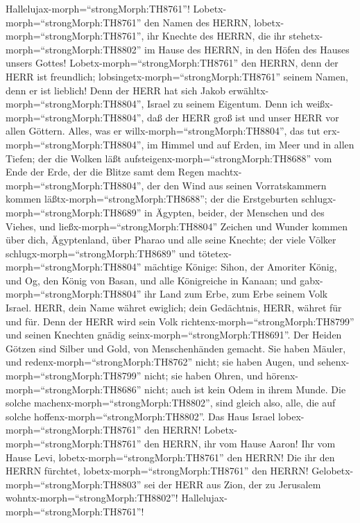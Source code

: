  Hallelujax-morph=``strongMorph:TH8761''!
Lobetx-morph=``strongMorph:TH8761'' den Namen des HERRN,
lobetx-morph=``strongMorph:TH8761'', ihr Knechte des HERRN, 
die ihr stehetx-morph=``strongMorph:TH8802'' im Hause des HERRN, in den
Höfen des Hauses unsers Gottes! 
Lobetx-morph=``strongMorph:TH8761'' den HERRN, denn der HERR ist
freundlich; lobsingetx-morph=``strongMorph:TH8761'' seinem Namen, denn
er ist lieblich!  Denn der HERR hat sich Jakob
erwähltx-morph=``strongMorph:TH8804'', Israel zu seinem Eigentum.
 Denn ich weißx-morph=``strongMorph:TH8804'', daß der HERR
groß ist und unser HERR vor allen Göttern.  Alles, was er
willx-morph=``strongMorph:TH8804'', das tut
erx-morph=``strongMorph:TH8804'', im Himmel und auf Erden, im Meer und
in allen Tiefen;  der die Wolken läßt
aufsteigenx-morph=``strongMorph:TH8688'' vom Ende der Erde, der die
Blitze samt dem Regen machtx-morph=``strongMorph:TH8804'', der den Wind
aus seinen Vorratskammern kommen läßtx-morph=``strongMorph:TH8688'';
 der die Erstgeburten schlugx-morph=``strongMorph:TH8689''
in Ägypten, beider, der Menschen und des Viehes,  und
ließx-morph=``strongMorph:TH8804'' Zeichen und Wunder kommen über dich,
Ägyptenland, über Pharao und alle seine Knechte;  der viele
Völker schlugx-morph=``strongMorph:TH8689'' und
tötetex-morph=``strongMorph:TH8804'' mächtige Könige: 
Sihon, der Amoriter König, und Og, den König von Basan, und alle
Königreiche in Kanaan;  und
gabx-morph=``strongMorph:TH8804'' ihr Land zum Erbe, zum Erbe seinem
Volk Israel.  HERR, dein Name währet ewiglich; dein
Gedächtnis, HERR, währet für und für.  Denn der HERR wird
sein Volk richtenx-morph=``strongMorph:TH8799'' und seinen Knechten
gnädig seinx-morph=``strongMorph:TH8691''.  Der Heiden
Götzen sind Silber und Gold, von Menschenhänden gemacht. 
Sie haben Mäuler, und redenx-morph=``strongMorph:TH8762'' nicht; sie
haben Augen, und sehenx-morph=``strongMorph:TH8799'' nicht;
 sie haben Ohren, und hörenx-morph=``strongMorph:TH8686''
nicht; auch ist kein Odem in ihrem Munde.  Die solche
machenx-morph=``strongMorph:TH8802'', sind gleich also, alle, die auf
solche hoffenx-morph=``strongMorph:TH8802''.  Das Haus
Israel lobex-morph=``strongMorph:TH8761'' den HERRN!
Lobetx-morph=``strongMorph:TH8761'' den HERRN, ihr vom Hause Aaron!
 Ihr vom Hause Levi, lobetx-morph=``strongMorph:TH8761''
den HERRN! Die ihr den HERRN fürchtet,
lobetx-morph=``strongMorph:TH8761'' den HERRN! 
Gelobetx-morph=``strongMorph:TH8803'' sei der HERR aus Zion, der zu
Jerusalem wohntx-morph=``strongMorph:TH8802''!
Hallelujax-morph=``strongMorph:TH8761''!

